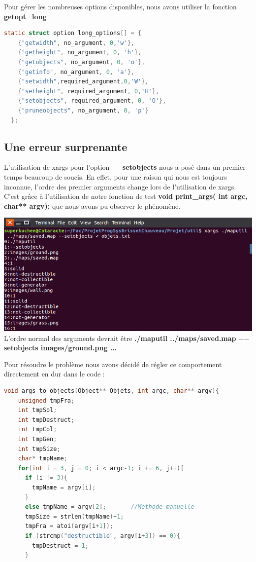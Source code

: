 \documentclass[a4paper]{article}
\begin{document}
Pour gérer les nombreuses options disponibles, nous avons utiliser la fonction \textbf{getopt\_long}
\begin{lstlisting}[language=c]
  static struct option long_options[] = {      
    {"getwidth", no_argument, 0,'w'},
    {"getheight", no_argument, 0, 'h'},
    {"getobjects", no_argument, 0, 'o'},
    {"getinfo", no_argument, 0, 'a'},
    {"setwidth",required_argument,0,'W'},
    {"setheight", required_argument, 0,'H'},
    {"setobjects", required_argument, 0, 'O'},
    {"pruneobjects", no_argument, 0, 'p'}
  };
\end{lstlisting}

\subsection{Une erreur surprenante}
L'utilisation de xargs pour l'option \textbf{$-$$-$setobjects} nous a posé dans un premier temps beaucoup de soucis. En effet, pour une raison qui nous est toujours inconnue, l'ordre des premier arguments change lors de l'utilisation de xargs. C'est grâce à l'utilisation de notre fonction de test \textbf{void print\_args( int argc, char** argv);} que nous avons pu observer le phénomène.



\includegraphics[scale=0.5]{erreurArgs.png}
\\
L'ordre normal des arguments devrait être \textbf{./maputil ../maps/saved.map $-$$-$setobjects images/ground.png ... }

Pour \og résoudre \fg le problème nous avons décidé de régler ce comportement directement en dur dans le code :

\begin{lstlisting}[language=c]
  void args_to_objects(Object** Objets, int argc, char** argv){
    unsigned tmpFra;
    int tmpSol;
    int tmpDestruct;
    int tmpCol;
    int tmpGen;
    int tmpSize;
    char* tmpName;
    for(int i = 3, j = 0; i < argc-1; i += 6, j++){
      if (i != 3){
        tmpName = argv[i];
      }
      else tmpName = argv[2];       //Methode manuelle
      tmpSize = strlen(tmpName)+1;    
      tmpFra = atoi(argv[i+1]);
      if (strcmp("destructible", argv[i+3]) == 0){
        tmpDestruct = 1;
      }
\end{lstlisting}
\end{document}
